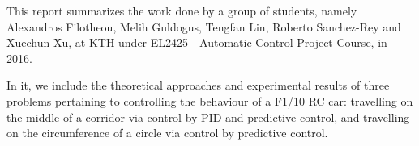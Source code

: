 This report summarizes the work done by a group of students, namely Alexandros
Filotheou, Melih Guldogus, Tengfan Lin, Roberto Sanchez-Rey and Xuechun Xu,
at KTH under EL2425 - Automatic Control Project Course, in 2016.

In it, we include the theoretical approaches and experimental results of
three problems pertaining to controlling the behaviour of a F1/10 RC car:
travelling on the middle of a corridor via control by PID and predictive
control, and travelling on the circumference of a circle via control by
predictive control.
